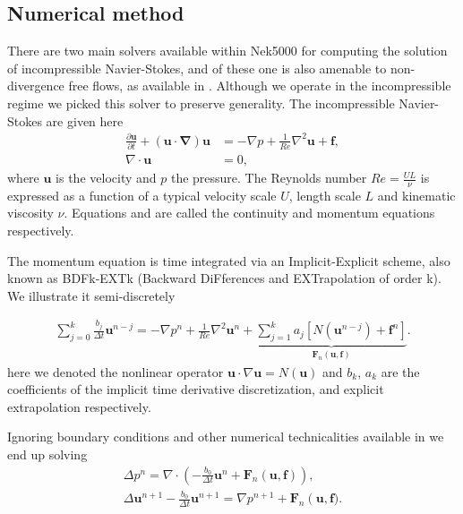 \documentclass{sig-alternate}
\begin{document}
\subsection{Numerical method}
There are two main solvers available within Nek5000 for computing the solution of incompressible Navier-Stokes, and of these one is also amenable to non-divergence free flows, as available in \cite{Tomboulides1997}. Although we operate in the incompressible regime we picked this solver to preserve generality. The incompressible Navier-Stokes are given here
\begin{align} 
 \frac{\partial \mathbf{u}}{\partial t} + (\mathbf{u \cdot \nabla}) \mathbf{u} & = - \nabla p + \frac{1}{Re} \nabla^2 \mathbf{u} + \mathbf{f} \label{eqn:NS_momentum},\\
 \nabla \cdot \mathbf{u} & = 0, \label{eqn:NS_continuity}
\end{align}
where $\mathbf{u}$ is the velocity and $p$ the pressure. The Reynolds number $Re = \frac{U L}{\nu}$ is expressed as a function of a typical velocity scale $U$, length scale $L$ and kinematic viscosity $\nu$. Equations   and  are called the continuity and momentum equations respectively. 

The momentum equation is time integrated via an Implicit-Explicit scheme, also
known as BDFk-EXTk (Backward DiFferences and EXTrapolation of order k). We
illustrate it semi-discretely

\begin{eqnarray}
\sum\limits_{j=0}^k \frac{b_j}{\Delta t} \mathbf u^{n-j}  = - \nabla p^{n}+\frac{1}{Re}\nabla^2\mathbf u^{n}+\underbrace{\sum\limits_{j=1}^k a_j [N(\mathbf u^{n-j})+\mathbf f^{n}]}_{\mathbf{F}_n(\mathbf u,\mathbf f)}.\label{eqn:discrete}
\end{eqnarray}
here we denoted the nonlinear operator $\mathbf u \cdot \nabla \mathbf u=N(\mathbf u)$ and $b_k$, $a_k$ are the coefficients of the implicit time derivative discretization, and explicit extrapolation respectively.

Ignoring boundary conditions and other numerical technicalities available in \cite{Tomboulides1997} we end up solving
\begin{eqnarray}
 \Delta p^{n} = \nabla \cdot \left( -\frac{b_0}{\Delta t} \mathbf{u}^{n} + \mathbf{F}_n \left( \mathbf{u},\mathbf f \right) \right), \label{eqn:hmhz_pres}\\
 \Delta \mathbf{u}^{n+1}- \frac{b_0}{\Delta t} \mathbf{u}^{n+1}  =  \nabla p^{n+1} + \mathbf{F}_n \left( \mathbf{u}, \mathbf f) \right. . \label{eqn:hmhz_vel}
\end{eqnarray}
\end{document}
